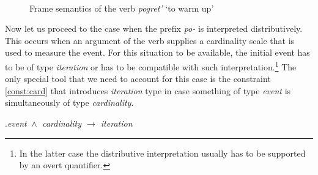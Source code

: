 \begin{figure}
\centering
{}\\
\caption{Frame semantics of the verb \textit{pogret'} `to warm up' \label{frame:pogret}}
\end{figure}

Now let us proceed to the case when the prefix \textit{po-} is interpreted distributively. This occurs when an argument of the verb supplies a cardinality scale that is used to measure the event. For this situation to be available, the initial event has to be of type \textit{iteration} or has to be compatible with such interpretation.\footnote{In the latter case the distributive interpretation usually has to be supported by an overt quantifier.} The only special tool that we need to account for this case is the constraint \ref{const:card} that introduces \textit{iteration} type in case something of type \textit{event} is simultaneously of type \textit{cardinality}. 

\ex.\label{const:card}\textit{event $\,\wedge\,$ cardinality $\rightarrow$ iteration}

 
